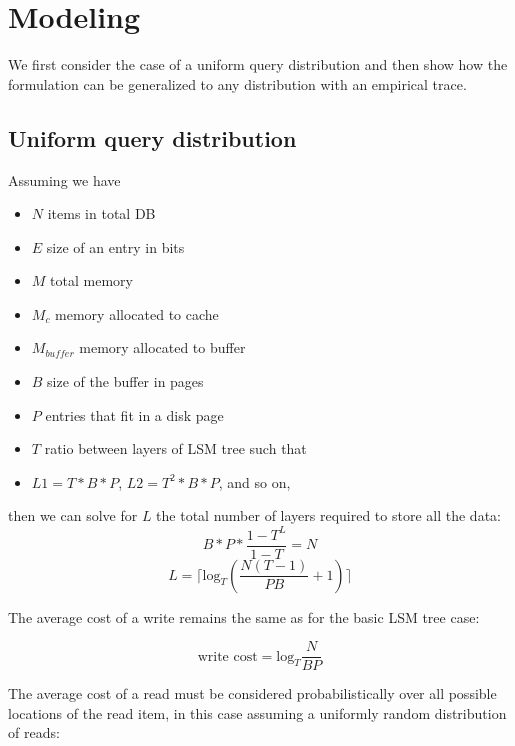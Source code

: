 \documentclass{cidr-2019}
\begin{document}
\clearpage

\section{Modeling} \label{modeling}

We first consider the case of a uniform query distribution and then show how
the formulation can be generalized to any distribution with an empirical trace.

\subsection{Uniform query distribution}

\noindent Assuming we have
\begin{itemize}
\itemsep-1em
\item $N$ items in total DB \\
\item $E$ size of an entry in bits \\
\item $M$ total memory \\
\item $M_c$ memory allocated to cache \\
\item $M_{buffer}$ memory allocated to buffer\\
\item $B$ size of the buffer in pages \\
\item $P$ entries that fit in a disk page \\
\item $T$ ratio between layers of LSM tree such that \\
\item $L1 = T * B* P$, $L2 =T^2 * B*P $, and so on,
\end{itemize}

\noindent then we can solve for $L$ the total number of layers required to store all the data: \\
$$B*P * \frac{1-T^L}{1-T} = N$$
$$L= \lceil \textrm{log}_{T} \left(\frac{N(T-1)}{PB} + 1\right) \rceil$$


The average cost of a write remains the same as for the basic LSM tree case:

$$
\text{write cost} = \textrm{log}_{T} \frac{N}{BP}
$$

The average cost of a read must be considered probabilistically over all
possible locations of the read item, in this case assuming a uniformly random
distribution of reads:
\end{document}
